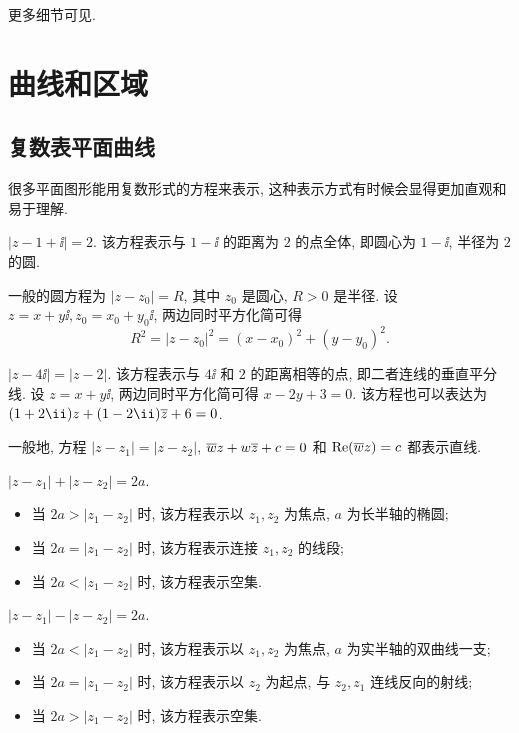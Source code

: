 更多细节可见\cite{3B1B}.


\section{曲线和区域}

\subsection{复数表平面曲线}

很多平面图形能用复数形式的方程来表示, 这种表示方式有时候会显得更加直观和易于理解.

\begin{exampleenum}
  \item $|z-1+\ii|=2$. 该方程表示与 $1-\ii$ 的距离为 $2$ 的点全体, 即圆心为 $1-\ii$, 半径为 $2$ 的圆.
  
  一般的圆方程为 $|z-z_0|=R$, 其中 $z_0$ 是圆心, $R>0$ 是半径.
  设 $z=x+y\ii,z_0=x_0+y_0\ii$, 两边同时平方化简可得
  \[
    R^2=|z-z_0|^2=(x-x_0)^2+(y-y_0)^2.
  \]
  \item $|z-4\ii|=|z-2|$. 该方程表示与 $4\ii$ 和 $2$ 的距离相等的点, 即二者连线的垂直平分线.
  设 $z=x+y\ii$, 两边同时平方化简可得 $x-2y+3=0$.
  该方程也可以表达为 $(1+2\ii)z+(1-2\ii)\ov z+6=0$.

  一般地, 方程 $|z-z_1|=|z-z_2|$, $\overline w z+w\overline z+c=0$ 和 $\operatorname{Re}(\overline wz)=c$ 都表示直线.
  \item $|z-z_1|+|z-z_2|=2a$.
  \begin{itemize}
    \item 当 $2a>|z_1-z_2|$ 时, 该方程表示以 $z_1,z_2$ 为焦点, $a$ 为长半轴的椭圆;
    \item 当 $2a=|z_1-z_2|$ 时, 该方程表示连接 $z_1,z_2$ 的线段;
    \item 当 $2a<|z_1-z_2|$ 时, 该方程表示空集.
  \end{itemize}
  \item $|z-z_1|-|z-z_2|=2a$.
  \begin{itemize}
    \item 当 $2a<|z_1-z_2|$ 时, 该方程表示以 $z_1,z_2$ 为焦点, $a$ 为实半轴的双曲线一支;
    \item 当 $2a=|z_1-z_2|$ 时, 该方程表示以 $z_2$ 为起点, 与 $z_2,z_1$ 连线反向的射线;
    \item 当 $2a>|z_1-z_2|$ 时, 该方程表示空集.
  \end{itemize}
\end{exampleenum}

